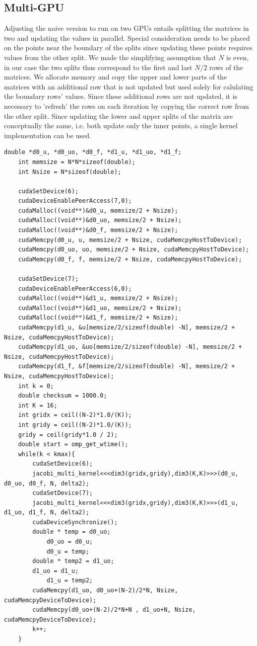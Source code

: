 \subsection{Multi-GPU}
Adjusting the naive version to run on two GPUs entails splitting the matrices in two and updating the values in parallel. Special consideration needs to be placed on the points near the boundary of the splits since updating these points requires values from the other split. We made the simplifying assumption that $N$ is even, in our case the two splits thus correspond to the first and last $N/2$ rows of the matrices. We allocate memory and copy the upper and lower parts of the matrices with an additional row that is not updated but used solely for calulating the boundary rows' values.
Since these additional rows are not updated, it is necessary to 'refresh' the rows on each iteration by copying the correct row from the other split. Since updating the lower and upper splits of the matrix are conceptually the same, i.e. both update only the inner points, a single kernel implementation can be used.


\begin{lstlisting}
double *d0_u, *d0_uo, *d0_f, *d1_u, *d1_uo, *d1_f;
	int memsize = N*N*sizeof(double);
	int Nsize = N*sizeof(double);

	cudaSetDevice(6);
	cudaDeviceEnablePeerAccess(7,0);
	cudaMalloc((void**)&d0_u, memsize/2 + Nsize);
	cudaMalloc((void**)&d0_uo, memsize/2 + Nsize);
	cudaMalloc((void**)&d0_f, memsize/2 + Nsize);
	cudaMemcpy(d0_u, u, memsize/2 + Nsize, cudaMemcpyHostToDevice);
	cudaMemcpy(d0_uo, uo, memsize/2 + Nsize, cudaMemcpyHostToDevice);
	cudaMemcpy(d0_f, f, memsize/2 + Nsize, cudaMemcpyHostToDevice);

	cudaSetDevice(7); 
	cudaDeviceEnablePeerAccess(6,0);
	cudaMalloc((void**)&d1_u, memsize/2 + Nsize);
	cudaMalloc((void**)&d1_uo, memsize/2 + Nsize);
	cudaMalloc((void**)&d1_f, memsize/2 + Nsize);
	cudaMemcpy(d1_u, &u[memsize/2/sizeof(double) -N], memsize/2 + Nsize, cudaMemcpyHostToDevice);
	cudaMemcpy(d1_uo, &uo[memsize/2/sizeof(double) -N], memsize/2 + Nsize, cudaMemcpyHostToDevice);
	cudaMemcpy(d1_f, &f[memsize/2/sizeof(double) -N], memsize/2 + Nsize, cudaMemcpyHostToDevice);
	int k = 0;
	double checksum = 1000.0;	
	int K = 16;
	int gridx = ceil((N-2)*1.0/(K));
 	int gridy = ceil((N-2)*1.0/(K));
	gridy = ceil(gridy*1.0 / 2);
	double start = omp_get_wtime(); 
	while(k < kmax){
		cudaSetDevice(6);
		jacobi_multi_kernel<<<dim3(gridx,gridy),dim3(K,K)>>>(d0_u, d0_uo, d0_f, N, delta2);
		cudaSetDevice(7);
		jacobi_multi_kernel<<<dim3(gridx,gridy),dim3(K,K)>>>(d1_u, d1_uo, d1_f, N, delta2);
		cudaDeviceSynchronize();
		double * temp = d0_uo;
    		d0_uo = d0_u;
    		d0_u = temp;
		double * temp2 = d1_uo;
		d1_uo = d1_u;
    		d1_u = temp2;
		cudaMemcpy(d1_uo, d0_uo+(N-2)/2*N, Nsize, cudaMemcpyDeviceToDevice);
		cudaMemcpy(d0_uo+(N-2)/2*N+N , d1_uo+N, Nsize, cudaMemcpyDeviceToDevice);
		k++;
	}
\end{lstlisting}

